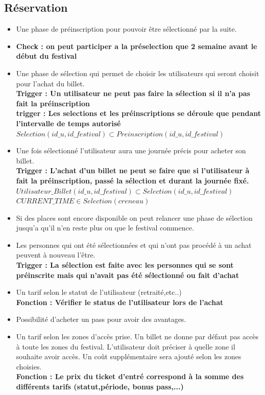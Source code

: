 \documentclass{article}
\begin{document}
\subsection{Réservation}
\begin{itemize}
    \item Une phase de préinscription pour pouvoir être sélectionné par la suite.\\
    \item \textbf{Check : on peut participer a la préselection que 2 semaine avant le début du festival}
    \item Une phase de sélection qui permet de choisir les utilisateurs qui seront choisit pour l'achat du billet.\\
    \textbf{Trigger : Un utilisateur ne peut pas faire la sélection si il n'a pas fait la préinscription}\\
    \textbf{trigger : Les selections et les préinscriptions se déroule que pendant l'intervalle de temps autorisé}
    $Selection(id\_u,id\_festival) \subset Preinscription(id\_u,id\_festival)$
    \item Une fois sélectionné l'utilisateur aura une journée précis pour acheter son billet.\\
    \textbf{Trigger :  L'achat d'un billet ne peut se faire que si l'utilisateur à fait la préinscription, passé la sélection et durant la journée fixé.}\\
    $Utilisateur\_Billet(id\_u,id\_festival) \subset Selection(id\_u,id\_festival)$ \\$CURRENT\_TIME \in Selection(creneau)$

    \item Si des places sont encore disponible on peut relancer une phase de sélection jusqu'a qu'il n'en reste plus ou que le festival commence.
    \item Les personnes qui ont été sélectionnées et qui n'ont pas procédé à un achat peuvent à nouveau l'être.\\
    \textbf{Trigger :  La sélection est faite avec les personnes qui se sont préinscrite mais qui n'avait pas été sélectionné ou fait d'achat}
    \item Un tarif selon le statut de l'utilisateur (retraité,etc..)\\
    \textbf{Fonction : Vérifier le status de l'utilisateur lors de l'achat}
    \item Possibilité d'acheter un pass pour avoir des avantages.
    \item Un tarif selon les zones d'accès prise. Un billet ne donne par défaut pas accès à toute les zones du festival. 
    L'utilisateur doit préciser à quelle zone il souhaite avoir accès. Un coût supplémentaire sera ajouté selon les zones choisies.\\
    \textbf{Fonction : Le prix du ticket d'entré correspond à la somme des différents tarifs (statut,période, bonus pass,...)}
    

\end{itemize}
\end{document}
